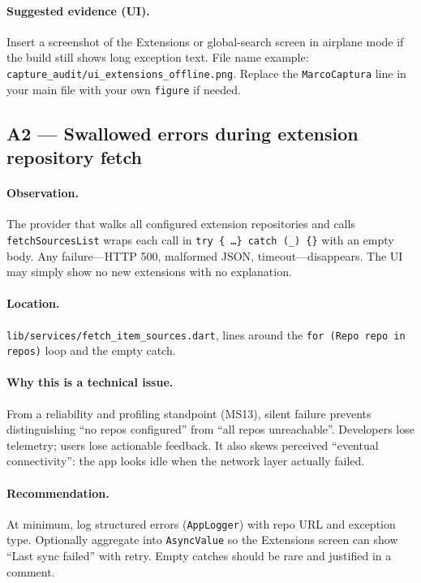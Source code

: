 \paragraph{Suggested evidence (UI).}
Insert a screenshot of the Extensions or global-search screen in airplane mode if the build still shows long exception text. File name example: \texttt{capture\_audit/ui\_extensions\_offline.png}. Replace the \texttt{MarcoCaptura} line in your main file with your own \texttt{figure} if needed.

\subsection*{A2 --- Swallowed errors during extension repository fetch}
\paragraph{Observation.}
The provider that walks all configured extension repositories and calls \texttt{fetchSourcesList} wraps each call in \texttt{try \{ \ldots \} catch (\_) \{\}} with an empty body. Any failure---HTTP 500, malformed JSON, timeout---disappears. The UI may simply show no new extensions with no explanation.

\paragraph{Location.}
\texttt{lib/services/fetch\_item\_sources.dart}, lines around the \texttt{for (Repo repo in repos)} loop and the empty catch.

\paragraph{Why this is a technical issue.}
From a reliability and profiling standpoint (MS13), silent failure prevents distinguishing ``no repos configured'' from ``all repos unreachable''. Developers lose telemetry; users lose actionable feedback. It also skews perceived ``eventual connectivity'': the app looks idle when the network layer actually failed.

\paragraph{Recommendation.}
At minimum, log structured errors (\texttt{AppLogger}) with repo URL and exception type. Optionally aggregate into \texttt{AsyncValue} so the Extensions screen can show ``Last sync failed'' with retry. Empty catches should be rare and justified in a comment.

